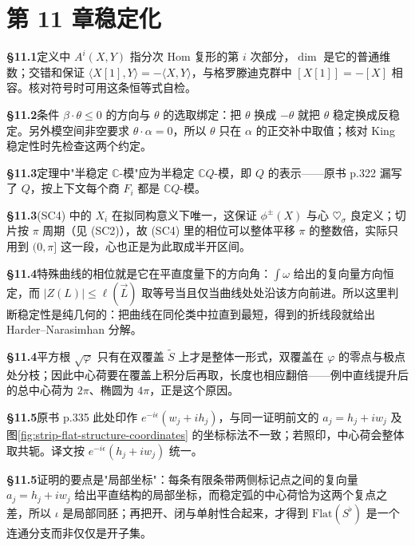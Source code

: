 \section*{第 11 章\quad 稳定化}
\noindent\textbf{§11.1}\quad 定义中 $A^{i}(X,Y)$ 指分次 $\mathrm{Hom}$ 复形的第 $i$ 次部分，$\dim$ 是它的普通维数；交错和保证 $\langle X[1],Y\rangle=-\langle X,Y\rangle$，与格罗滕迪克群中 $[X[1]]=-[X]$ 相容。核对符号时可用这条恒等式自检。\par\medskip
\noindent\textbf{§11.2}\quad 条件 $\beta\cdot\theta\le0$ 的方向与 $\theta$ 的选取绑定：把 $\theta$ 换成 $-\theta$ 就把 $\theta$ 稳定换成反稳定。另外模空间非空要求 $\theta\cdot\alpha=0$，所以 $\theta$ 只在 $\alpha$ 的正交补中取值；核对 King 稳定性时先检查这两个约定。\par\medskip
\noindent\textbf{§11.3}\quad 定理中"半稳定 $\mathbb C$-模"应为半稳定 $\mathbb C Q$-模，即 $Q$ 的表示——原书 p.322 漏写了 $Q$，按上下文每个商 $F_i$ 都是 $\mathbb C Q$-模。\par\medskip
\noindent\textbf{§11.3}\quad (SC4) 中的 $X_i$ 在拟同构意义下唯一，这保证 $\phi^{\pm}(X)$ 与心 $\heartsuit_\sigma$ 良定义；切片按 $\pi$ 周期（见 (SC2)），故 (SC4) 里的相位可以整体平移 $\pi$ 的整数倍，实际只用到 $(0,\pi]$ 这一段，心也正是为此取成半开区间。\par\medskip
\noindent\textbf{§11.4}\quad 特殊曲线的相位就是它在平直度量下的方向角：$\int\omega$ 给出的复向量方向恒定，而 $|Z(L)|\le\ell(\vec L)$ 取等号当且仅当曲线处处沿该方向前进。所以这里判断稳定性是纯几何的：把曲线在同伦类中拉直到最短，得到的折线段就给出 Harder--Narasimhan 分解。\par\medskip
\noindent\textbf{§11.4}\quad 平方根 $\sqrt{\varphi}$ 只有在双覆盖 $\widetilde S$ 上才是整体一形式，双覆盖在 $\varphi$ 的零点与极点处分枝；因此中心荷要在覆盖上积分后再取，长度也相应翻倍——例中直线提升后的总中心荷为 $2\pi$、椭圆为 $4\pi$，正是这个原因。\par\medskip
\noindent\textbf{§11.5}\quad 原书 p.335 此处印作 $e^{-i\epsilon}(w_j+ih_j)$，与同一证明前文的 $a_j=h_j+iw_j$ 及图\ref{fig:strip-flat-structure-coordinates} 的坐标标法不一致；若照印，中心荷会整体取共轭。译文按 $e^{-i\epsilon}(h_j+iw_j)$ 统一。\par\medskip
\noindent\textbf{§11.5}\quad 证明的要点是"局部坐标"：每条有限条带两侧标记点之间的复向量 $a_j=h_j+iw_j$ 给出平直结构的局部坐标，而稳定弧的中心荷恰为这两个复点之差，所以 $\iota$ 是局部同胚；再把开、闭与单射性合起来，才得到 $\mathrm{Flat}(S^{\flat})$ 是一个连通分支而非仅仅是开子集。\par\medskip
